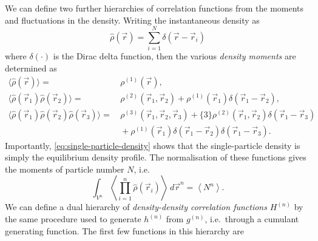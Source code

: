 We can define two further hierarchies of correlation functions from the moments and fluctuations in the density.
Writing the instantaneous density as
\begin{equation*}\label{eq:instantaneous-density}
  \hat\rho(\vec{r}) = \sum_{i=1}^N \delta(\vec{r} - \vec{r}_i)
\end{equation*}
where $\delta(\cdot)$ is the Dirac delta function, then the various \emph{density moments} are determined as
\begin{subequations}
  \begin{align}
    \langle \hat\rho(\vec{r}) \rangle
    =& \,
    \rho^{(1)}(\vec{r}),
    \label{eq:single-particle-density}
    \\
    \big\langle \hat\rho(\vec{r}_1) \hat\rho(\vec{r}_2) \big\rangle
    =& \,
    \rho^{(2)}(\vec{r}_1, \vec{r}_2) +
    \rho^{(1)}(\vec{r}_1) \delta(\vec{r}_1 - \vec{r}_2),
    \\
    \big\langle \hat\rho(\vec{r}_1) \hat\rho(\vec{r}_2) \hat\rho(\vec{r}_3) \big\rangle
    =& \,
    \rho^{(3)}(\vec{r}_1, \vec{r}_2, \vec{r}_3) +
    \{3\} \rho^{(2)}(\vec{r}_1, \vec{r}_2) \delta(\vec{r}_1 - \vec{r}_3)
    \nonumber \\ & \,
    + \rho^{(1)}(\vec{r}_1) \delta(\vec{r}_1 - \vec{r}_2) \delta(\vec{r}_1 - \vec{r}_3).
  \end{align}
\end{subequations}
Importantly, \eqref{eq:single-particle-density} shows that the single-particle density is simply the equilibrium density profile.
The normalisation of these functions gives the moments of particle number $N$, i.e.\
\begin{equation}
  \int_{V^n}
  \left\langle
  \prod_{i=1}^n \hat\rho(\vec{r}_i)
  \right\rangle
  \, d\vec{r}^n
  =
  \left\langle N^n \right\rangle.
\end{equation}
We can define a dual hierarchy of \emph{density-density correlation functions} $H^{(n)}$ by the same procedure used to generate $h^{(n)}$ from $g^{(n)}$, i.e.\ through a cumulant generating function.
The first few functions in this hierarchy are
